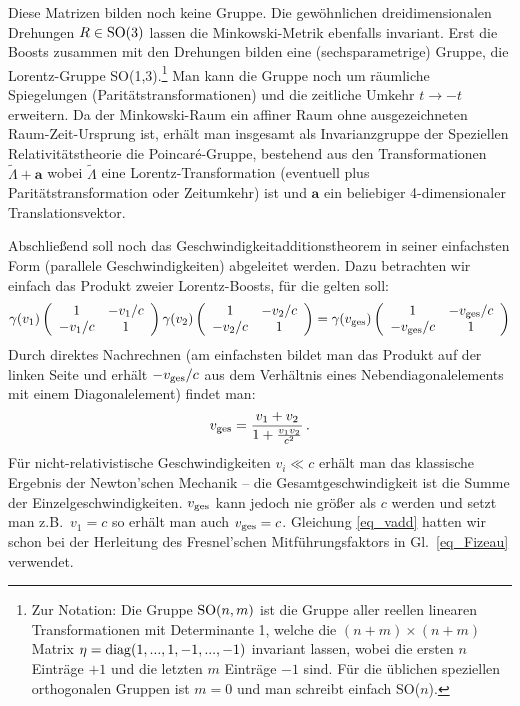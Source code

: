 Diese Matrizen bilden noch keine Gruppe. 
Die gew\"ohnlichen dreidimensionalen Drehungen
$R\in {\rm SO}(3)$ lassen die Minkowski-Metrik
ebenfalls invariant. Erst die Boosts zusammen mit
den Drehungen bilden eine (sechsparametrige) Gruppe, die 
Lorentz-Gruppe SO(1,3).\footnote{Zur Notation: Die
Gruppe ${\rm SO}(n,m)$ ist die Gruppe aller
reellen linearen Transformationen mit Determinante 1,
welche die $(n+m)\times (n+m)$ Matrix 
$\eta={\rm diag}(1,...,1,-1,...,-1)$
invariant lassen, wobei die ersten $n$ 
Eintr\"age $+1$ und die letzten $m$ Eintr\"age
$-1$ sind. F\"ur die \"ublichen speziellen 
orthogonalen Gruppen ist $m=0$ und man
schreibt einfach SO($n$).} Man kann die Gruppe noch
um r\"aumliche Spiegelungen (Parit\"atstransformationen)
und die zeitliche Umkehr $t\rightarrow -t$ erweitern.
Da der Minkowski-Raum ein affiner Raum ohne
ausgezeichneten Raum-Zeit-Ursprung ist, erh\"alt man
insgesamt als Invarianzgruppe der Speziellen
Relativit\"atstheorie die
Poincar\'{e}-Gruppe, bestehend aus den
Transformationen $\tilde{\Lambda}+\pmb{a}$
wobei $\tilde{\Lambda}$ eine Lorentz-Transformation
(eventuell plus Parit\"atstransformation oder
Zeitumkehr) ist und $\pmb{a}$ ein beliebiger
4-dimensionaler Translationsvektor.   

Abschlie\ss end soll noch das
Geschwindigkeitadditionstheorem in seiner
einfachsten Form (parallele Geschwindigkeiten)
abgeleitet werden. Dazu betrachten wir einfach
das Produkt zweier Lorentz-Boosts, f\"ur
die gelten soll:
\begin{equation}
   \gamma (v_1) \left( \begin{array}{cc}
     1 & - v_1/c \\ - v_1/c & 1 
   \end{array} \right) 
   \gamma (v_2) \left( \begin{array}{cc}
     1 & - v_2/c \\ - v_2/c & 1 
   \end{array} \right)  =
   \gamma (v_{\rm ges}) \left( \begin{array}{cc}
     1 & - v_{\rm ges} /c \\ - v_{\rm ges}/c & 1 
   \end{array} \right) 
\end{equation}
Durch direktes Nachrechnen (am einfachsten
bildet man das Produkt auf der linken Seite
und erh\"alt $-v_{\rm ges}/c$ aus dem
Verh\"altnis eines Nebendiagonalelements
mit einem Diagonalelement) findet man:
\begin{equation}
\label{eq_vadd}
     v_{\rm ges} = \frac{ v_1 + v_2}{1+ \frac{v_1 v_2}{c^2}} \, .
\end{equation}
F\"ur nicht-relativistische Geschwindigkeiten
$v_i\ll c$ erh\"alt man das klassische
Ergebnis der Newton'schen Mechanik --
die Gesamtgeschwindigkeit ist die Summe
der Einzelgeschwindigkeiten. $v_{\rm ges}$
kann jedoch nie gr\"o\ss er als $c$ werden
und setzt man z.B.\ $v_1=c$ so erh\"alt man
auch $v_{\rm ges}=c$. Gleichung \ref{eq_vadd}
hatten wir schon bei der Herleitung des
Fresnel'schen Mitf\"uhrungsfaktors in
Gl.\ \ref{eq_Fizeau} verwendet.

